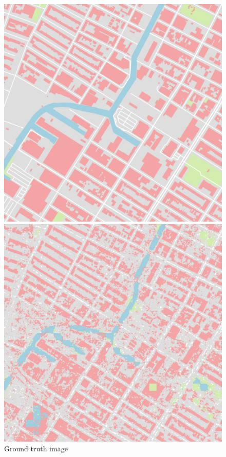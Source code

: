 \documentclass[]{IEEEtran}
\begin{document}
\begin{figure}[!hbt]
		\vspace{0.3cm}
		\begin{center}
			\begin{minipage}[t]{0.21\textwidth}
				\includegraphics[width=\columnwidth]{06Basic}
				\caption{Ground truth image}
				\label{fig:gt}
			\end{minipage}
		    \hspace{0.5cm}
			\begin{minipage}[t]{0.21\textwidth}
				\includegraphics[width=\columnwidth]{dlv3_out}

\end{minipage}
\end{center}
\end{figure}
\end{document}
